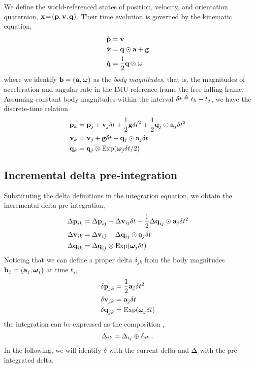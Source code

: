 We define the world-referenced states of position, velocity, and orientation quaternion, ${\bf x}\!=\!({\bf p},{\bf v},{\bf q})$. 
Their time evolution is governed by the kinematic equation,
%
\begin{align}\label{equ:cont_basic}
\dot{{\bf p}} &= {\bf v} \\
\dot{{\bf v}} &= {\bf q}\odot{\bf a} + {\bf g} \\
\dot{{\bf q}} &= \frac12{\bf q}\otimes{{\bm \omega}} 
\end{align}
%
where we identify ${\bf b}=({\bf a},{{\bm \omega}})$ as the \emph{body magnitudes}, that is, the magnitudes of acceleration and angular rate in the IMU reference frame \wrt the free-falling frame.
Assuming constant body magnitudes within the interval $\delta t\triangleq t_k-t_j$, we have the discrete-time relation
%
\begin{align}\label{equ:g_second_order_integration}
\begin{split}
{\bf p}_{k} &= {\bf p}_j + {\bf v}_j\delta t  + \frac12{\bf g}\delta t^2 + \frac12{\bf q}_j\odot{\bf a}_j\delta t^2 \\
{\bf v}_{k} &= {\bf v}_j + {\bf g}\delta t + {\bf q}_j\odot{\bf a}_j\delta t \\
{\bf q}_{k} &= {\bf q}_j\otimes\operatorname*{Exp}({{\bm \omega}}_j\delta t/2) 
\end{split}
\end{align}


\subsection{Incremental delta pre-integration}
%
Substituting the delta definitions in the integration equation, we obtain the incremental delta pre-integration,
%
\begin{align}\label{equ:g_second_order_pre-integration}
\begin{split}
{\Delta{\bf p}}_{ik} 
&= {\Delta{\bf p}}_{ij} + {\Delta{\bf v}}_{ij}\delta t + \frac12{\Delta{\bf q}}_{ij}\odot{\bf a}_j\delta t^2 \\
{\Delta{\bf v}}_{ik} 
&= {\Delta{\bf v}}_{ij} + {\Delta{\bf q}}_{ij}\odot{\bf a}_j\delta t \\
{\Delta{\bf q}}_{ik} 
&= {\Delta{\bf q}}_{ij}\otimes\operatorname*{Exp}({{\bm \omega}}_j\delta t) 
\end{split}
\end{align}
%
Noticing that we can define a proper delta $\delta_{jk}$ from the body magnitudes ${\bf b}_j=({\bf a}_j,{{\bm \omega}}_j)$ at time $t_j$,
%
\begin{align}\label{equ:delta_creation}
\begin{split}
{\delta{\bf p}}_{jk} &= \frac12{\bf a}_j\delta t^2 \\
{\delta{\bf v}}_{jk} &= {\bf a}_j\delta t \\
{\delta{\bf q}}_{jk} &= \operatorname*{Exp}({{\bm \omega}}_j\delta t)
\end{split}
\end{align}
%
the integration  can be expressed as the composition , 
%
\begin{align}\label{equ:composition_compact}
\Delta_{ik}=\Delta_{ij}\oplus\delta_{jk}
~.
\end{align}
%
In the following, we will identify $\delta$ with the current delta and $\Delta$ with the pre-integrated delta.

